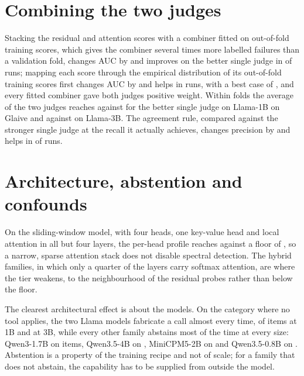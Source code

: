 \section{Combining the two judges}
\label{app:combining}

Stacking the residual and attention scores with a combiner fitted on out-of-fold training scores, which
gives the combiner several times more labelled failures than a validation fold, changes AUC by
\agrStackGain{} and improves on the better single judge in \agrStackPositive{} of \agrNRuns{} runs; mapping
each score through the empirical distribution of its out-of-fold training scores first changes AUC by
\agrStackRankGain{} and helps in \agrStackRankPositive{} runs, with a best case of \agrStackRankGainMax{}, and
every fitted combiner gave both judges positive weight. Within folds the average of the two judges reaches
\poolWithinMeanLlamaOneBGlaive{} against \poolWithinPerHeadLlamaOneBGlaive{} for the better single judge on
Llama-1B on Glaive and \poolWithinMeanLlamaThreeBGlaive{} against \poolWithinHiddenLlamaThreeBGlaive{} on
Llama-3B. The agreement rule, compared against the stronger single judge at the recall it actually achieves,
changes precision by \agrMatchedGain{} and helps in \agrMatchedPositive{} of \agrNRuns{} runs.

\section{Architecture, abstention and confounds}
\label{app:arch}
\label{sec:exp:arch}
\label{sec:exp:confound}
\label{app:confound}

On the sliding-window model, with four heads, one key-value head and local attention in all but four layers,
the per-head profile reaches \aucPerHeadAllGemmaGlaiveSem{} against a floor of
\aucSurfaceConfoundGemmaGlaiveSem{}, so a narrow, sparse attention stack does not disable spectral detection.
The hybrid families, in which only a quarter of the layers carry softmax attention, are where the tier
weakens, to the neighbourhood of the residual probes rather than below the floor.

The clearest architectural effect is about the models. On the category where no tool applies, the two Llama
models fabricate a call almost every time, \modeLlamaOneBBfclOvertrigger{} of \nIrrelevanceItems{} items at
1B and \modeLlamaThreeBBfclOvertrigger{} at 3B, while every other family abstains most of the time at every
size: Qwen3-1.7B on \modeQwenDenseBfclValidnocall{} items, Qwen3.5-4B on \modeQwenFourBBfclValidnocall{},
MiniCPM5-2B on \modeMiniCpmBfclValidnocall{} and Qwen3.5-0.8B on \modeQwenSmallBfclValidnocall{}. Abstention is
a property of the training recipe and not of scale; for a family that does not abstain, the capability has to
be supplied from outside the model.


